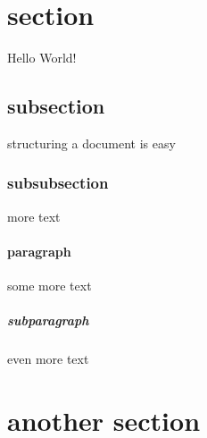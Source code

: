 \documentclass{article}
\begin{document}
	\section{section}
	Hello World!
	\subsection{subsection}
	structuring a document is easy
	\subsubsection{subsubsection}
	more text
	\paragraph{paragraph}
	some more text
	\subparagraph{subparagraph}
	even more text
	\section{another section}
\end{document}
